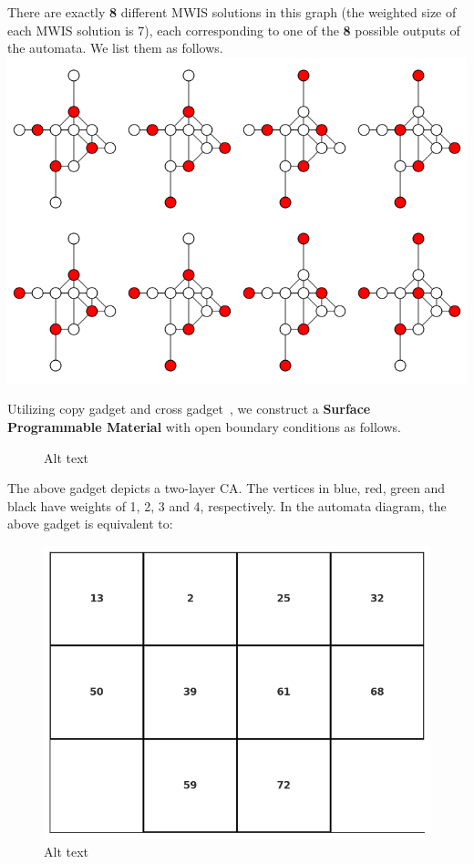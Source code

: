 \documentclass[twocolumn,superscriptaddress,english,showpacs,longbibliography]{revtex4-2}
\begin{document}
There are exactly \textbf{8} different MWIS solutions in this graph (the
weighted size of each MWIS solution is 7), each corresponding to one of
the \textbf{8} possible outputs of the automata. We list them as
follows.
\includegraphics[width=\columnwidth]{../notes/images/gadget110.png}

Utilizing copy gadget and cross gadget~\cite{Nguyen2023}, we construct a \textbf{Surface Programmable Material} with open boundary conditions as follows.

\begin{figure}
\centering

\caption{Alt text}
\end{figure}

The above gadget depicts a two-layer CA. The vertices in
blue, red, green and black have weights of 1, 2, 3 and 4, respectively.
In the automata diagram, the above gadget is equivalent to:

\begin{figure}
\centering
\includegraphics[width=\columnwidth]{../notes/images/rule110_2-2_automata.png}
\caption{Alt text}
\end{figure}
\end{document}
